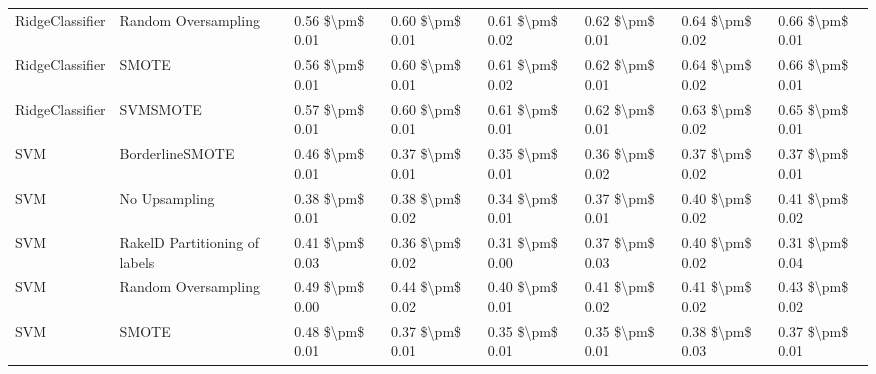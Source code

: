 \begin{tabular}{llllllll}
                RidgeClassifier &           Random Oversampling & 0.56 \$\textbackslash pm\$ 0.01 &           0.60 \$\textbackslash pm\$ 0.01 &       0.61 \$\textbackslash pm\$ 0.02 &        0.62 \$\textbackslash pm\$ 0.01 &                         0.64 \$\textbackslash pm\$ 0.02 &     0.66 \$\textbackslash pm\$ 0.01 \\
                RidgeClassifier &                         SMOTE & 0.56 \$\textbackslash pm\$ 0.01 &           0.60 \$\textbackslash pm\$ 0.01 &       0.61 \$\textbackslash pm\$ 0.02 &        0.62 \$\textbackslash pm\$ 0.01 &                         0.64 \$\textbackslash pm\$ 0.02 &     0.66 \$\textbackslash pm\$ 0.01 \\
                RidgeClassifier &                      SVMSMOTE & 0.57 \$\textbackslash pm\$ 0.01 &           0.60 \$\textbackslash pm\$ 0.01 &       0.61 \$\textbackslash pm\$ 0.01 &        0.62 \$\textbackslash pm\$ 0.01 &                         0.63 \$\textbackslash pm\$ 0.02 &     0.65 \$\textbackslash pm\$ 0.01 \\
                            SVM &               BorderlineSMOTE & 0.46 \$\textbackslash pm\$ 0.01 &           0.37 \$\textbackslash pm\$ 0.01 &       0.35 \$\textbackslash pm\$ 0.01 &        0.36 \$\textbackslash pm\$ 0.02 &                         0.37 \$\textbackslash pm\$ 0.02 &     0.37 \$\textbackslash pm\$ 0.01 \\
                            SVM &                 No Upsampling & 0.38 \$\textbackslash pm\$ 0.01 &           0.38 \$\textbackslash pm\$ 0.02 &       0.34 \$\textbackslash pm\$ 0.01 &        0.37 \$\textbackslash pm\$ 0.01 &                         0.40 \$\textbackslash pm\$ 0.02 &     0.41 \$\textbackslash pm\$ 0.02 \\
                            SVM & RakelD Partitioning of labels & 0.41 \$\textbackslash pm\$ 0.03 &           0.36 \$\textbackslash pm\$ 0.02 &       0.31 \$\textbackslash pm\$ 0.00 &        0.37 \$\textbackslash pm\$ 0.03 &                         0.40 \$\textbackslash pm\$ 0.02 &     0.31 \$\textbackslash pm\$ 0.04 \\
                            SVM &           Random Oversampling & 0.49 \$\textbackslash pm\$ 0.00 &           0.44 \$\textbackslash pm\$ 0.02 &       0.40 \$\textbackslash pm\$ 0.01 &        0.41 \$\textbackslash pm\$ 0.02 &                         0.41 \$\textbackslash pm\$ 0.02 &     0.43 \$\textbackslash pm\$ 0.02 \\
                            SVM &                         SMOTE & 0.48 \$\textbackslash pm\$ 0.01 &           0.37 \$\textbackslash pm\$ 0.01 &       0.35 \$\textbackslash pm\$ 0.01 &        0.35 \$\textbackslash pm\$ 0.01 &                         0.38 \$\textbackslash pm\$ 0.03 &     0.37 \$\textbackslash pm\$ 0.01 \\

\end{tabular}
